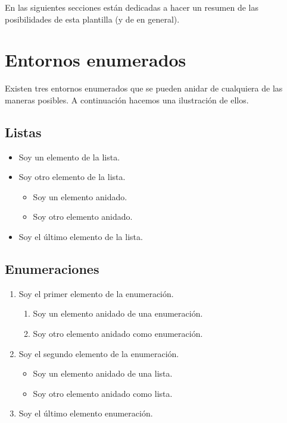 \documentclass{DeustoFDP}
\begin{document}
En las siguientes secciones est\'an dedicadas a hacer un resumen de las
posibilidades de esta plantilla (y de  en general).

\section{Entornos enumerados}

Existen tres entornos enumerados que se pueden anidar de cualquiera de las
maneras posibles. A continuaci\'on hacemos una ilustraci\'on de ellos.

\subsection{Listas}
\begin{itemize}
  \item Soy un elemento de la lista.
  \item Soy otro elemento de la lista.
  \begin{itemize}
    \item Soy un elemento anidado.
    \item Soy otro elemento anidado.
  \end{itemize}
  \item Soy el \'ultimo elemento de la lista.
\end{itemize}

\subsection{Enumeraciones}
\begin{enumerate}
  \item Soy el primer elemento de la enumeraci\'on.
  \begin{enumerate}
    \item Soy un elemento anidado de una enumeraci\'on.
    \item Soy otro elemento anidado como enumeraci\'on.
  \end{enumerate}
  \item Soy el segundo elemento de la enumeraci\'on.
  \begin{itemize}
    \item Soy un elemento anidado de una lista.
    \item Soy otro elemento anidado como lista.
  \end{itemize}
  \item Soy el \'ultimo elemento enumeraci\'on.
\end{enumerate}
\end{document}
